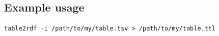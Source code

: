 \documentclass[11pt,a4paper,oneside]{book}
\begin{document}
\subsection{Example usage}

\begin{siderules}
\begin{verbatim}
table2rdf -i /path/to/my/table.tsv > /path/to/my/table.ttl
\end{verbatim}
\end{siderules}






\end{document}
